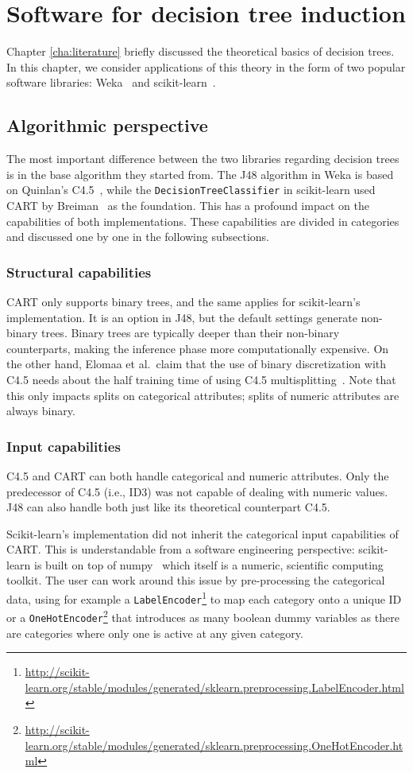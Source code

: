 \chapter{Software for decision tree induction}\label{cha:software}
Chapter \ref{cha:literature} briefly discussed the theoretical basics of decision trees. In this chapter, we consider applications of this theory in the form of two popular software libraries: Weka~\cite{eibe2016weka} and scikit-learn~\cite{scikit-learn}.

\section{Algorithmic perspective}
The most important difference between the two libraries regarding decision trees is in the base algorithm they started from. The J48 algorithm in Weka is based on Quinlan's C4.5~\cite{c45}, while the \texttt{DecisionTreeClassifier} in scikit-learn used CART by Breiman~\cite{cart} as the foundation. This has a profound impact on the capabilities of both implementations. These capabilities are divided in categories and discussed one by one in the following subsections.

\subsection{Structural capabilities}
CART only supports binary trees, and the same applies for scikit-learn's implementation. It is an option in J48, but the default settings generate non-binary trees. Binary trees are typically deeper than their non-binary counterparts, making the inference phase more computationally expensive. On the other hand, Elomaa et al.\ claim that the use of binary discretization with C4.5 needs about the half training time of using C4.5 multisplitting~\cite{elomaa1999general}. Note that this only impacts splits on categorical attributes; splits of numeric attributes are always binary.

\subsection{Input capabilities}
C4.5 and CART can both handle categorical and numeric attributes. Only the predecessor of C4.5 (i.e., ID3) was not capable of dealing with numeric values. J48 can also handle both just like its theoretical counterpart C4.5.

Scikit-learn's implementation did not inherit the categorical input capabilities of CART. This is understandable from a software engineering perspective: scikit-learn is built on top of numpy~\cite{numpy} which itself is a numeric, scientific computing toolkit. The user can work around this issue by pre-processing the categorical data, using for example a \texttt{LabelEncoder}\footnote{\url{http://scikit-learn.org/stable/modules/generated/sklearn.preprocessing.LabelEncoder.html}} to map each category onto a unique ID or a \texttt{OneHotEncoder}\footnote{\url{http://scikit-learn.org/stable/modules/generated/sklearn.preprocessing.OneHotEncoder.html}} that introduces as many boolean dummy variables as there are categories where only one is active at any given category.

